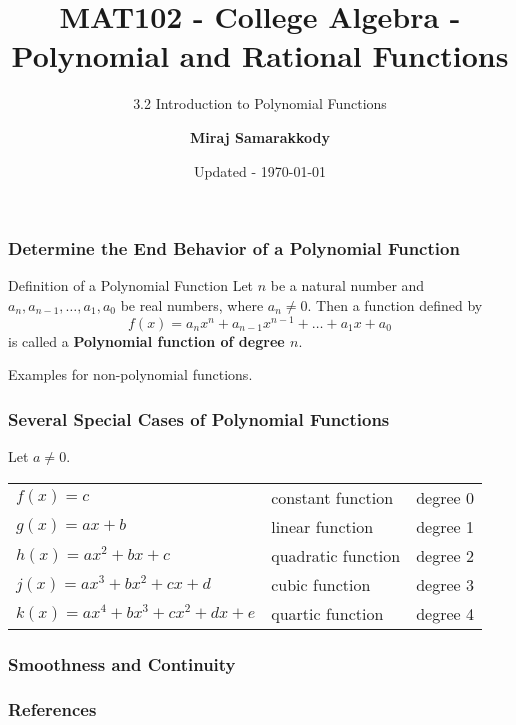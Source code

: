 \documentclass{beamer}
\title{MAT102 - College Algebra - Polynomial and Rational Functions}
\subtitle{3.2 Introduction to Polynomial Functions \cite{miller2016college}}
\author{\textbf{Miraj Samarakkody}}
\institute{Tougaloo College}
\date{Updated - \today}
\begin{document}
\begin{frame}
    \titlepage
\end{frame}

\begin{frame}
    \frametitle{Determine the End Behavior of a Polynomial Function}

    \begin{block}{Definition of a Polynomial Function}
        Let \(n\) be a natural number and \(a_n, a_{n-1}, \dots, a_1, a_0\) be real numbers, where \(a_n \ne 0\). Then a function defined by \[f(x)=a_n x^n+a_{n-1}x^{n-1}+\dots + a_1 x +a_0\]
        is called a \textbf{Polynomial function of degree \(n\)}. 
    \end{block}\pause
    \vspace{1cm}
    Examples for non-polynomial functions. 


\end{frame}

\begin{frame}
    \frametitle{Several Special Cases of Polynomial Functions}

    Let \(a \ne 0\). \\



\begin{tabular}{lll}
    \(f(x)=c\) & constant function  & degree 0\\
    \(g(x)=ax +b\) & linear function & degree 1 \\
    \(h(x)= ax^2+bx+c\) & quadratic function & degree 2 \\
    \(j(x)=ax^3+bx^2+cx+d\) & cubic function & degree 3 \\
    \(k(x)=ax^4+bx^3+cx^2+dx+e\)& quartic function & degree 4
\end{tabular}
    

\end{frame}

\begin{frame}
    \frametitle{Smoothness and Continuity}

    

\end{frame}



\begin{frame}
    \frametitle{References}
\end{frame}
\end{document}
